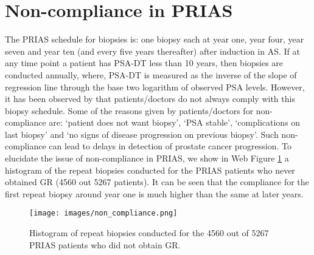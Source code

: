
\section{Non-compliance in PRIAS}
The PRIAS schedule for biopsies is: one biopsy each at year one, year four, year seven and year ten (and every five years thereafter) after induction in AS. If at any time point a patient has PSA-DT less than 10 years, then biopsies are conducted annually, where, PSA-DT is measured as the inverse of the slope of regression line through the base two logarithm of observed PSA levels. However, it has been observed by \citet{bokhorst2015compliance} that patients/doctors do not always comply with this biopsy schedule. Some of the reasons given by patients/doctors for non-compliance are: `patient does not want biopsy', `PSA stable', `complications on last biopsy' and `no signs of disease progression on previous biopsy'. Such non-compliance can lead to delays in detection of prostate cancer progression. To elucidate the issue of non-compliance in PRIAS, we show in Web Figure \ref{web_fig : non_compliance} a histogram of the repeat biopsies conducted for the PRIAS patients who never obtained GR (4560 out 5267 patients). It can be seen that the compliance for the first repeat biopsy around year one is much higher than the same at later years.

\begin{figure}
\centerline{
\texttt{[image: images/non\_compliance.png]}
}
\caption{Histogram of repeat biopsies conducted for the 4560 out of 5267 PRIAS patients who did not obtain GR.}
\label{web_fig : non_compliance}
\end{figure}